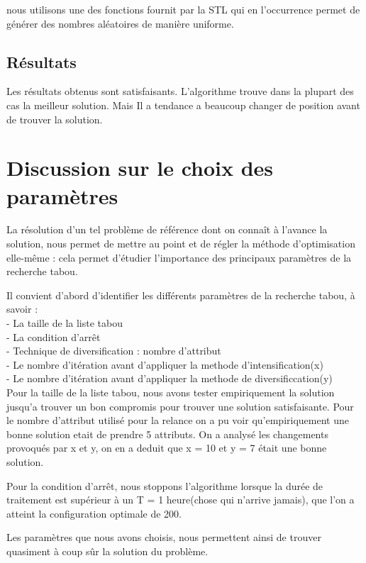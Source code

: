 \documentclass{report}
\begin{document}
 nous utilisons une des fonctions fournit par la STL qui en l’occurrence permet de générer des nombres aléatoires de manière uniforme.

\subsection{Résultats}
Les résultats obtenus sont satisfaisants. L'algorithme trouve dans la plupart des cas la meilleur solution. Mais Il a tendance a beaucoup changer de position avant de trouver la solution.


\section{Discussion sur le choix des paramètres}
La résolution d'un tel problème de référence dont on connaît à l'avance la solution, nous permet de mettre au point et de régler la méthode d'optimisation elle-même : cela permet d'étudier l'importance des principaux paramètres de la recherche tabou.

Il convient d'abord d'identifier les différents paramètres de la recherche tabou, à savoir :\\
- La taille de la liste tabou\\
- La condition d'arrêt\\
- Technique de diversification : nombre d'attribut\\
- Le nombre d'itération avant d'appliquer la methode d'intensification(x)\\
- Le nombre d'itération avant d'appliquer la methode de diversificcation(y)\\

Pour la taille de la liste tabou, nous avons tester empiriquement la solution jusqu'a trouver un bon compromis pour trouver une solution satisfaisante. 
Pour le nombre d'attribut utilisé pour la relance on a pu voir qu'empiriquement une bonne solution etait de prendre 5 attributs.
On a analysé les changements provoqués par x et y, on en a deduit que x = 10 et y = 7 était une bonne solution.

Pour la condition d'arrêt, nous stoppons l'algorithme lorsque la durée de traitement est supérieur à un T = 1 heure(chose qui n'arrive jamais), que l'on a atteint la configuration optimale de 200.

Les paramètres que nous avons choisis, nous permettent ainsi de trouver quasiment à coup sûr la solution du problème.
\end{document}
